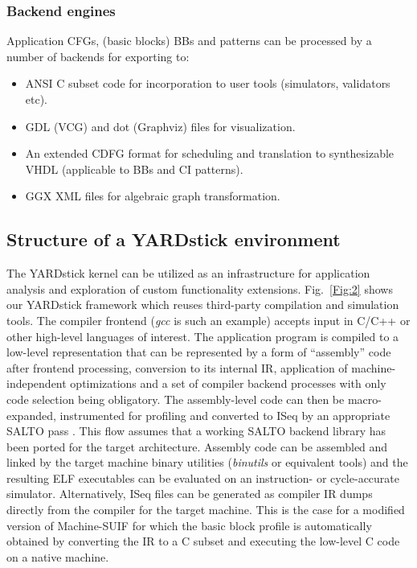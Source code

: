 \documentclass{comjnl}
\begin{document}
\subsubsection{Backend engines}
\label{Sec:backends}
Application CFGs, (basic blocks) BBs and patterns can be processed by a number of backends for exporting to:
\begin{itemize}
\item {ANSI C subset code for incorporation to user tools (simulators, validators etc).}
\item {GDL (VCG) \cite{VCG} and dot (Graphviz) \cite{Graphviz} files for visualization.}
\item {An extended CDFG \cite{CDFGtool} format for scheduling and translation to synthesizable VHDL (applicable to BBs and CI patterns).}
\item {GGX XML \cite{AGG} files for algebraic graph transformation.}
\end{itemize}

\subsection{Structure of a YARDstick environment}
\label{Sec:YARDstickStructure}
The YARDstick kernel can be utilized as an infrastructure for application analysis and exploration of custom functionality extensions. Fig.~\ref{Fig:2} shows our YARDstick framework which reuses third-party compilation and simulation tools. The compiler frontend ({\it gcc} is such an example) accepts input in C/C++ or other high-level languages of interest. The application program is compiled to a low-level representation that can be represented by a form of ``assembly'' code after frontend processing, conversion to its internal IR, application of machine-independent optimizations and a set of compiler backend processes with only code selection being obligatory. The assembly-level code can then be macro-expanded, instrumented for profiling and converted to ISeq by an appropriate SALTO pass \cite{SALTO}. This flow assumes that a working SALTO backend library has been ported for the target architecture. Assembly code can be assembled and linked by the target machine binary utilities ({\it binutils} or equivalent tools) and the resulting ELF executables can be evaluated on an instruction- or cycle-accurate simulator. Alternatively, ISeq files can be generated as compiler IR dumps directly from the compiler for the target machine. This is the case for a modified version of Machine-SUIF \cite{MachSUIF} for which the basic block profile is automatically obtained by converting the IR to a C subset and executing the low-level C code on a native machine.
\end{document}
